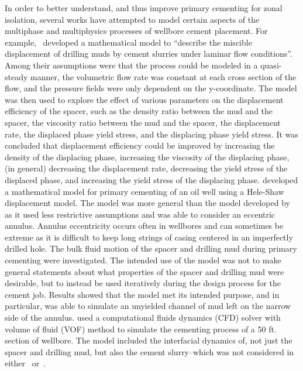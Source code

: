 \documentclass[pdftex,ms]{pittetd}
\begin{document}

In order to better understand, and thus improve primary cementing for zonal isolation, several works have attempted to model certain aspects of the multiphase and multiphysics processes of wellbore cement placement.
For example,~\citet{Bei77} developed a mathematical model to ``describe the miscible displacement of drilling muds by cement slurries under laminar flow conditions''.
Among their assumptions were that the process could be modeled in a quasi-steady manner, the volumetric flow rate was constant at each cross section of the flow, and the pressure fields were only dependent on the y-coordinate.
The model was then used to explore the effect of various parameters on the displacement efficiency of the spacer, such as the density ratio between the mud and the spacer, the viscosity ratio between the mud and the spacer, the displacement rate, the displaced phase yield stress, and the displacing phase yield stress.
It was concluded that displacement efficiency could be improved by increasing the density of the displacing phase, increasing the viscosity of the displacing phase, (in general) decreasing the displacement rate, decreasing the yield stress of the displaced phase, and increasing the yield stress of the displacing phase.
\citet{Bit02} developed a mathematical model for primary cementing of an oil well using a Hele-Shaw displacement model.
The model was more general than the model developed by~\citeauthor{Bei77} as it used less restrictive assumptions and was able to consider an eccentric annulus.
Annulus eccentricity occurs often in wellbores and can sometimes be extreme as it is difficult to keep long strings of casing centered in an imperfectly drilled hole.
The bulk fluid motion of the spacer and drilling mud during primary cementing were investigated.
The intended use of the model was not to make general statements about what properties of the spacer and drilling mud were desirable, but to instead be used iteratively during the design process for the cement job.
Results showed that the model met its intended purpose, and in particular, was able to simulate an unyielded channel of mud left on the narrow side of the annulus.
\citet{Zul12} used a computational fluids dynamics (CFD) solver with volume of fluid (VOF) method to simulate the cementing process of a 50 ft. section of wellbore.
The model included the interfacial dynamics of, not just the spacer and drilling mud, but also the cement slurry--which was not considered in either~\citeauthor{Bei77} or~\citeauthor{Bit02}.
\end{document}
